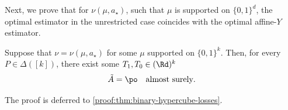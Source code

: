 Next, we prove that for $\nu(\mu, a_\star)$,
such that $\mu$ is supported on $\{0,1\}^d$,
the optimal estimator in the unrestricted case
coincides with the optimal affine-$Y$ estimator.

\begin{theorem}
    \label{thm:binary-hypercube-losses}
    Suppose that $\nu = \nu(\mu, a_\star)$
    for some $\mu$ supported on $\{0,1\}^k$.
    Then, for every $P \in \Delta([k])$,
    there exist some $T_1, T_0 \in (\Rd)^k$
    \begin{align*}
        \tilde{A} = \po \quad \text{almost surely}.
    \end{align*}
\end{theorem}
\noindent The proof is deferred to \ref{proof:thm:binary-hypercube-losses}.


